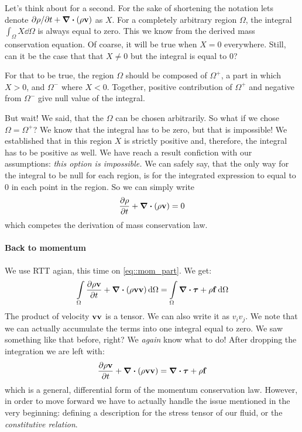 \documentclass[a4paper]{article}
\begin{document}
Let's think about for a second. For the sake of shortening the notation 
lets denote \({\partial\rho}/{\partial t} + \div{(\rho \vb{v})}\) as \(X\). For a 
completely arbitrary region \(\Omega\), the integral \(\int_\Omega X \dd{\Omega}\)
is always equal to zero. This we know from the derived mass conservation equation.
Of coarse, it will be true when \(X=0\) everywhere. Still, can it be the case that
that \(X\neq0\) but the integral is equal to 0? 

For that to be true, the region \(\Omega\) should be composed of \(\Omega^+\),
a part in which \(X>0\), and \(\Omega^-\) where \(X<0\). Together, positive 
contribution of \(\Omega^+\) and negative from \(\Omega^-\) give null value 
of the integral. 

But wait! We said, that the \(\Omega\) can be chosen arbitrarily. So what
if we chose \(\Omega = \Omega^+\)? We know that the integral has to be zero,
but that is impossible! We established that in this region \(X\) is strictly 
positive and, therefore, the integral has to be positive as well. We have 
reach a result confiction with our assumptions: \emph{this option is 
impossible.} We can safely say, that the only way for the integral to 
be null for each region, is for the integrated expression to equal to 0
in each point in the region. So we can simply write
\[
\pdv{\rho}{t} + \div{(\rho \vb{v})} = 0
\]
which competes the derivation of mass conservation law.

\paragraph{Back to momentum}
We use RTT agian, this time on \autoref{eq::mom_part}. We get:
\[
  \int\limits_\Omega \pdv{\rho \vb{v}}{t} 
  + \div{\qty(\rho\vb{v}\vb{v} )} \dd{\Omega} =
  \int\limits_\Omega \div\bm{\tau} + \rho\vb{f} \dd{\Omega} 
\]
The product of velocity \(\vb{v}\vb{v}\) is a tensor. We can also write
it as \(v_i v_j\). We note that we can actually accumulate the terms into 
one integral equal to zero. We saw something like that before, right? 
We \emph{again} know what to do! After dropping the integration we are 
left with:
\begin{equation}\label{eq::momentum_general_form}
  \pdv{\rho \vb{v}}{t} 
  + \div{\qty(\rho\vb{v}\vb{v} )}  =
  \div\bm{\tau} + \rho\vb{f}
\end{equation}
which is a general, differential form of the momentum conservation law.
However, in order to move forward we have to actually handle the issue 
mentioned in the very beginning: defining a description for the stress 
tensor of our fluid, or the \emph{constitutive relation}.
\end{document}
